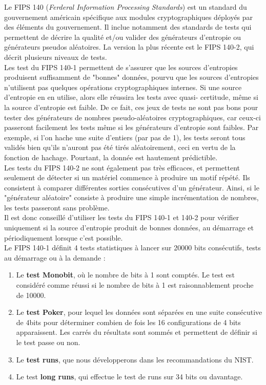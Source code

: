 		Le FIPS 140 (\textit{Ferderal Information Processing Standards}) est un standard du gouvernement américain spécifique aux modules cryptographiques déployés par des éléments du gouvernement. Il inclue notamment des standards de tests qui permettent de décrire la qualité et/ou valider des générateurs d'entropie ou générateurs pseudos aléatoires. La version la plus récente est le FIPS 140-2, qui décrit plusieurs niveaux de tests.\\
		
		
		Les test du FIPS 140-1 permettent de s'assurer que les sources d'entropies produisent suffisamment de "bonnes" données, pourvu que les sources d'entropies n'utilisent pas quelques opérations cryptographiques internes. Si une source d'entropie en en utilise, alors elle réussira les tests avec quasi- certitude, même si la source d'entropie est faible. De ce fait, ces jeux de tests ne sont pas bons pour tester des générateurs de nombres pseudo-aléatoires cryptographiques, car ceux-ci passeront facilement les tests même si les générateurs d'entropie sont faibles. Par exemple, si l'on hache une suite d'entiers (par pas de 1), les tests seront tous validés bien qu'ils n'auront pas été tirés aléatoirement, ceci en vertu de la fonction de hachage. Pourtant, la donnée est hautement prédictible.\\
		
		
		Les tests du FIPS 140-2 ne sont également pas très efficaces, et permettent seulement de détecter si un matériel commence à produire un motif répété. Ils consistent à comparer différentes sorties consécutives d'un générateur. Ainsi, si le "générateur aléatoire" consiste à produire une simple incrémentation de nombres, les tests passeront sans problème.\\
		
		
		Il est donc conseillé d'utiliser les tests du FIPS 140-1 et 140-2 pour vérifier uniquement si la source d'entropie produit de bonnes données, au démarrage et périodiquement lorsque c'est possible. \\
		
		
		
		Le FIPS 140-1 définit 4 tests statistiques à lancer sur 20000 bits consécutifs, tests au démarrage ou à la demande : 
		\begin{enumerate}
		\item Le \textbf{test Monobit}, où le nombre de bits à 1 sont comptés. Le test est considéré comme réussi si le nombre de bits à 1 est raisonnablement proche de 10000.
		\item Le \textbf{test Poker}, pour lequel les données sont séparées en une suite consécutive de 4bits pour déterminer combien de fois les 16 configurations de 4 bits apparaissent. Les carrés du résultats sont sommés et permettent de définir si le test passe ou non. 
		\item Le \textbf{test runs}, que nous développerons dans les recommandations du NIST.
		\item Le test \textbf{long runs}, qui effectue le test de runs sur 34 bits ou davantage.\\
		\end{enumerate}
		
